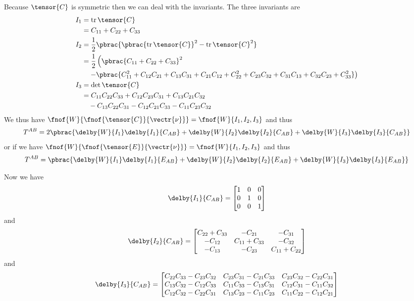 Because $\tensor{C}$ is symmetric then we can deal with the invariants. The
three invariants are
\begin{equation}
  \begin{split}
    I_{1} &= \operatorname{tr}\tensor{C} \\
    &= C_{11} + C_{22} + C_{33} \\
    I_{2} &=
    \dfrac{1}{2}\pbrac{\pbrac{\operatorname{tr}\tensor{C}}^{2}-\operatorname{tr}\tensor{C}^{2}} \\
    &=
    \dfrac{1}{2}\left(\pbrac{C_{11}+C_{22}+C_{33}}^{2}\right. \\
      & \quad\left.-\pbrac{C_{11}^{2}+C_{12}C_{21}+C_{13}C_{31}+
        C_{21}C_{12}+C_{22}^{2}+C_{23}C_{32}+C_{31}C_{13}+C_{32}C_{23}+C_{33}^{2}}\right) \\
    I_{3} &= \det{\tensor{C}} \\
    &=C_{11}C_{22}C_{33}+C_{12}C_{23}C_{31}+C_{13}C_{21}C_{32}\\
    &\quad-C_{13}C_{22}C_{31}-C_{12}C_{21}C_{33}-C_{11}C_{23}C_{32}
  \end{split}
\end{equation}
We thus have
$\fnof{W}{\fnof{\tensor{C}}{\vectr{\nu}}}=\fnof{W}{I_{1},I_{2},I_{3}}$ and
thus
\begin{equation}
  T^{AB}=2\pbrac{\delby{W}{I_{1}}\delby{I_{1}}{C_{AB}}+\delby{W}{I_{2}}\delby{I_{2}}{C_{AB}}+\delby{W}{I_{3}}\delby{I_{3}}{C_{AB}}}
\end{equation}
or if we have
$\fnof{W}{\fnof{\tensor{E}}{\vectr{\nu}}}=\fnof{W}{I_{1},I_{2},I_{3}}$ and
thus
\begin{equation}
  T^{AB}=\pbrac{\delby{W}{I_{1}}\delby{I_{1}}{E_{AB}}+\delby{W}{I_{2}}\delby{I_{2}}{E_{AB}}+\delby{W}{I_{3}}\delby{I_{3}}{E_{AB}}}
\end{equation}

Now we have
\begin{equation}
  \delby{I_{1}}{C_{AB}}=\begin{bmatrix}
    1 & 0 & 0 \\
    0 & 1 & 0 \\
    0 & 0 & 1
  \end{bmatrix}
\end{equation}
and
\begin{equation}
  \delby{I_{2}}{C_{AB}}=\begin{bmatrix}
    C_{22}+C_{33} & -C_{21} & -C_{31} \\
    -C_{12} & C_{11}+C_{33} & -C_{32} \\
    -C_{13} & -C_{23} & C_{11}+C_{22}
  \end{bmatrix}
\end{equation}
and
\begin{equation}
  \delby{I_{3}}{C_{AB}}=\begin{bmatrix}
    C_{22}C_{33}-C_{23}C_{32} & C_{23}C_{31}-C_{21}C_{33} & C_{23}C_{32}-C_{22}C_{31} \\
    C_{13}C_{32}-C_{12}C_{33} & C_{11}C_{33}-C_{13}C_{31} & C_{12}C_{31}-C_{11}C_{32} \\
    C_{12}C_{32}-C_{22}C_{31} & C_{13}C_{23}-C_{11}C_{23} & C_{11}C_{22}-C_{12}C_{21}
  \end{bmatrix}
\end{equation}

